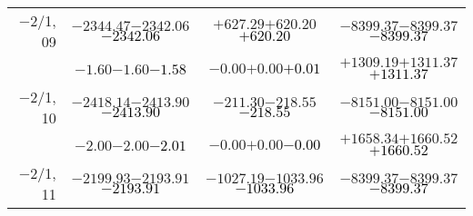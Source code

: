 \documentclass[compress]{beamer}
\begin{document}
\begin{frame}
{\begin{tabular}{r | c | c | c}
$-$2/1, 09 & $-2344.47$\hspace{0.1 cm}$-2342.06$\hspace{0.1 cm}\textcolor{black}{$-2342.06$} & $+627.29$\hspace{0.1 cm}$+620.20$\hspace{0.1 cm}\textcolor{black}{$+620.20$} & $-8399.37$\hspace{0.1 cm}$-8399.37$\hspace{0.1 cm}\textcolor{black}{$-8399.37$} \\
           & $-1.60$\hspace{0.1 cm}$-1.60$\hspace{0.1 cm}\textcolor{black}{$-1.58$} & $-0.00$\hspace{0.1 cm}$+0.00$\hspace{0.1 cm}\textcolor{black}{$+0.01$} & $+1309.19$\hspace{0.1 cm}$+1311.37$\hspace{0.1 cm}\textcolor{black}{$+1311.37$} \\
$-$2/1, 10 & $-2418.14$\hspace{0.1 cm}$-2413.90$\hspace{0.1 cm}\textcolor{black}{$-2413.90$} & $-211.30$\hspace{0.1 cm}$-218.55$\hspace{0.1 cm}\textcolor{black}{$-218.55$} & $-8151.00$\hspace{0.1 cm}$-8151.00$\hspace{0.1 cm}\textcolor{black}{$-8151.00$} \\
           & $-2.00$\hspace{0.1 cm}$-2.00$\hspace{0.1 cm}\textcolor{black}{$-2.01$} & $-0.00$\hspace{0.1 cm}$+0.00$\hspace{0.1 cm}\textcolor{black}{$-0.00$} & $+1658.34$\hspace{0.1 cm}$+1660.52$\hspace{0.1 cm}\textcolor{black}{$+1660.52$} \\
$-$2/1, 11 & $-2199.93$\hspace{0.1 cm}$-2193.91$\hspace{0.1 cm}\textcolor{black}{$-2193.91$} & $-1027.19$\hspace{0.1 cm}$-1033.96$\hspace{0.1 cm}\textcolor{black}{$-1033.96$} & $-8399.37$\hspace{0.1 cm}$-8399.37$\hspace{0.1 cm}\textcolor{black}{$-8399.37$} \\

\end{tabular}}
\end{frame}
\end{document}
